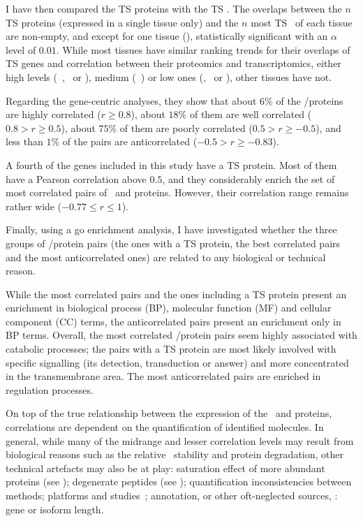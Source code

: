 I have then compared the \gls{TS} proteins with the \gls{TS} \mRNAs{}.
The overlaps between the $n$ \gls{TS} proteins (expressed in a single tissue only)
and the $n$ most \gls{TS} \mRNAs\ of each tissue are non-empty,
and except for one tissue (\urinarybladder),
statistically significant with an $\alpha$ level of $0.01$.
While most tissues have similar ranking trends for their overlaps of \gls{TS} genes
and correlation between their proteomics and transcriptomics,
either high levels (\eg\ \liver, \testis\ or \pancreas),
medium (\eg\ \prostate)
or low ones (\urinarybladder, \lung\ or \gallbladder),
other tissues have not.\mybr\

Regarding the gene-centric analyses,
they show that
about $6\%$ of the \mRNAs/proteins are highly correlated ($r≥0.8$),
about $18\%$ of them are well correlated ($0.8 > r ≥ 0.5$),
about $75\%$ of them are poorly correlated ($0.5 > r ≥ -0.5$), and
less than $1\%$ of the pairs are anticorrelated ($-0.5 > r ≥ -0.83$).\mybr\

A fourth of the genes included in this study have a \gls{TS} protein.
Most of them have a Pearson correlation above $0.5$, and
they considerably enrich the set of most correlated pairs of \mRNAs\ and proteins.
However, their correlation range remains rather wide ($-0.77 ≤ r≤ 1$).\mybr\

Finally, using a \gls{go} enrichment analysis,
I have investigated whether the three groups of \mRNA/protein pairs
(the ones with a \gls{TS} protein, the best correlated pairs
and the most anticorrelated ones) are related to
any biological or technical reason.\mybr\

While the most correlated pairs and the ones including a \gls{TS} protein
present an enrichment in biological process (BP),
molecular function (MF) and cellular component (CC) terms,
the anticorrelated pairs present an enrichment only in BP terms.
Overall, the most correlated \mRNA/protein pairs seem highly associated
with catabolic processes;
the pairs with a \gls{TS} protein are most likely involved
with specific signalling (its detection, transduction or answer)
and more concentrated in the transmembrane area.
The most anticorrelated pairs are enriched in regulation processes.\mybr\

On top of the true relationship between the expression of the \mRNAs\ and proteins,
correlations are dependent on the quantification of identified molecules.
In general,
while many of the midrange and lesser correlation levels may result
from biological reasons such as
the relative \mRNA\ stability and protein degradation,
other technical artefacts may also be at play:
saturation effect of more abundant proteins (see );
degenerate peptides (see );
quantification inconsistencies between methods;
platforms and studies~;
annotation,
or other oft-neglected sources, \eg{}: gene or isoform length.

